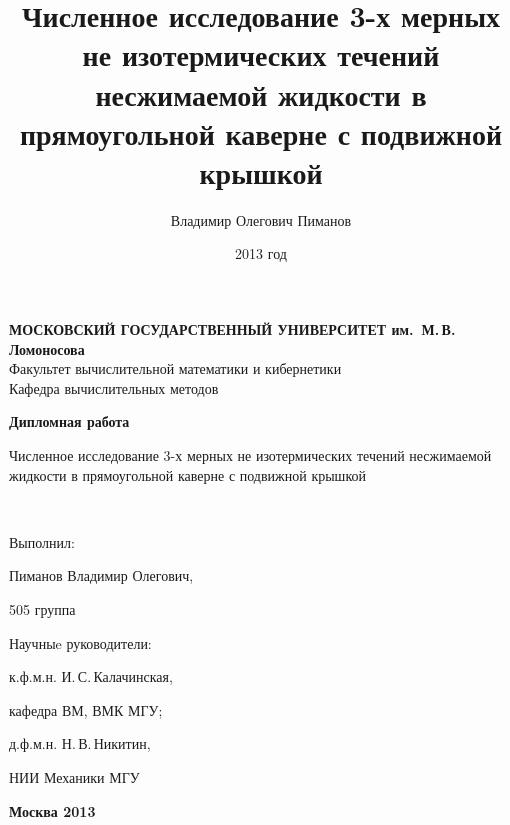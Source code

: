 \documentclass{scrartcl}
\title{Численное исследование 3-х мерных не изотермических течений несжимаемой жидкости в прямоугольной каверне с подвижной крышкой}
\author{Владимир Олегович Пиманов}
\date{2013 год}
\begin{document}

\thispagestyle{empty}
\begin{center}
{\bfseries МОСКОВСКИЙ ГОСУДАРСТВЕННЫЙ УНИВЕРСИТЕТ им.~М.{\,}В.{\,}Ломоносова}\\
\vspace{2ex}Факультет вычислительной математики и кибернетики \\
\vspace{2ex}Кафедра вычислительных методов \\
\end{center}

\vfill

\begin{center}
{\huge {\bfseries Дипломная работа

\vspace*{1cm}

Численное исследование 3-х мерных не изотермических течений несжимаемой жидкости в прямоугольной каверне с подвижной крышкой} \\[25mm]}

\end{center}

\vfill 

\hspace*{7cm} Выполнил:

\hspace*{7cm} Пиманов Владимир Олегович,

\hspace*{7cm} 505 группа

\hspace*{7cm} Научныe руководители:

\hspace*{7cm} к.ф.м.н. И.{\,}С.{\,}Калачинская,

\hspace*{7cm} кафедра ВМ, ВМК МГУ;

\hspace*{7cm} д.ф.м.н. Н.{\,}В.{\,}Никитин,

\hspace*{7cm} НИИ Механики МГУ

\hspace*{7cm} 

\bigskip

\vfill

\begin{center}
{\bfseries Москва 2013}
\end{center}
\end{document}
